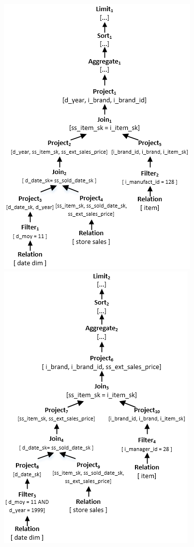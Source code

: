\begin{figure}[htbp]
	\centering
	\includegraphics[scale=0.5]{figures/q3}
	\includegraphics[scale=0.5]{figures/q55}

\end{figure}
